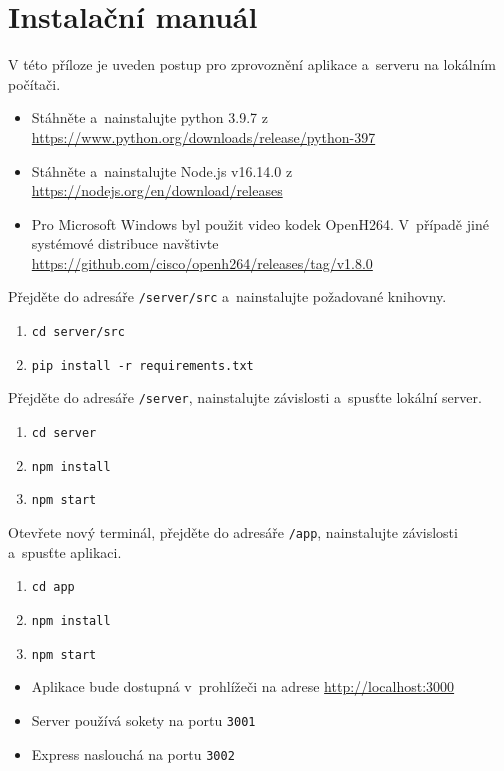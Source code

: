 

\chapter{Instalační manuál}
V této příloze je uveden postup pro zprovoznění aplikace a~serveru na lokálním počítači.

\begin{itemize}
    \item Stáhněte a~nainstalujte python 3.9.7 z \newline\url{https://www.python.org/downloads/release/python-397}
    \item Stáhněte a~nainstalujte Node.js v16.14.0 z \newline\url{https://nodejs.org/en/download/releases}
    \item Pro Microsoft Windows byl použit video kodek OpenH264. V~případě jiné systémové distribuce navštivte \url{https://github.com/cisco/openh264/releases/tag/v1.8.0}
\end{itemize}
Přejděte do adresáře \texttt{/server/src} a~nainstalujte požadované knihovny.
\begin{enumerate}
    \item \texttt{cd server/src}
    \item \texttt{pip install -r requirements.txt}
\end{enumerate}
Přejděte do adresáře \texttt{/server}, nainstalujte závislosti a~spusťte lokální server.
\begin{enumerate}
    \item \texttt{cd server}
    \item \texttt{npm install}
    \item \texttt{npm start}
\end{enumerate}
Otevřete nový terminál, přejděte do adresáře \texttt{/app}, nainstalujte závislosti a~spusťte aplikaci.
\begin{enumerate}
    \item \texttt{cd app}
    \item \texttt{npm install}
    \item \texttt{npm start}
\end{enumerate}
\begin{itemize}
    \item Aplikace bude dostupná v~prohlížeči na adrese \url{http://localhost:3000}
    \item Server používá sokety na portu \texttt{3001}
    \item Express naslouchá na portu \texttt{3002}
\end{itemize}


